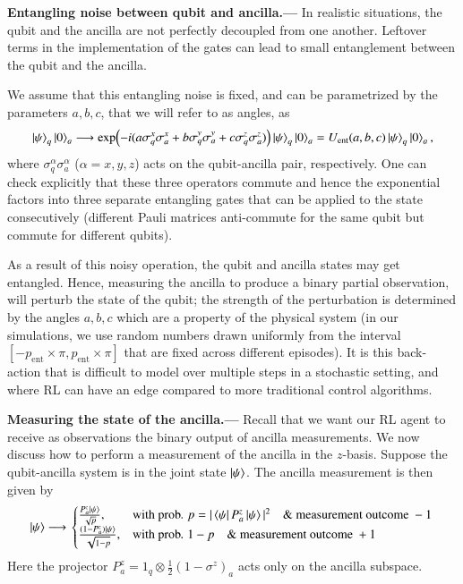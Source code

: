 \textbf{Entangling noise between qubit and ancilla.---} In realistic situations, the qubit and the ancilla are not perfectly decoupled from one another. Leftover terms in the implementation of the gates can lead to small entanglement between the qubit and the ancilla. 

We assume that this entangling noise is fixed, and can be parametrized by the parameters $a,b,c$, that we will refer to as angles, as 
\begin{equation}
    \ket{\psi}_q\ket{0}_a \longrightarrow  \exp(-i(a \sigma^x_q\sigma^x_a + b \sigma^y_q\sigma^y_a + c \sigma^z_q\sigma^z_a)) \ket{\psi}_q\ket{0}_a=U_\text{ent}(a,b,c)\ket{\psi}_q\ket{0}_a, 
\end{equation}
where $\sigma^\alpha_q\sigma^\alpha_a$ ($\alpha=x,y,z$) acts on the qubit-ancilla pair, respectively. One can check explicitly that these three operators commute and hence the exponential factors into three separate entangling gates that can be applied to the state consecutively (different Pauli matrices anti-commute for the same qubit but commute for different qubits). 

As a result of this noisy operation, the qubit and ancilla states may get entangled. Hence, measuring the ancilla to produce a binary partial observation, will perturb the state of the qubit; the strength of the perturbation is determined by the angles $a,b,c$ which are a property of the physical system (in our simulations, we use random numbers drawn uniformly from the interval $[-p_\text{ent}\times \pi, p_\text{ent}\times \pi]$ that are fixed across different episodes). It is this back-action that is difficult to model over multiple steps in a stochastic setting, and where RL can have an edge compared to more traditional control algorithms.    

\textbf{Measuring the state of the ancilla.---} Recall that we want our RL agent to receive as observations the binary output of ancilla measurements. We now discuss how to perform a measurement of the ancilla in the $z$-basis. Suppose the qubit-ancilla system is in the joint state $\ket{\psi}$. The ancilla measurement is then given by
\begin{equation}
    \ket{\psi} \longrightarrow 
\left.
  \begin{cases}
    \frac{P_a^z\ket{\psi}}{\sqrt{p}}, & \text{with prob. } p=|\bra{\psi}P_a^z\ket{\psi}|^2 \quad \text{\&\ measurement outcome } -1  \\
    \frac{(1-P_a^z)\ket{\psi}}{\sqrt{1-p}}, & \text{with prob. } 1-p \quad \text{\&\ measurement outcome } +1
  \end{cases}
  \right.
\end{equation}
Here the projector $P_a^z = 1_q\otimes \frac{1}{2}(1-\sigma^z)_a$ acts only on the ancilla subspace. 

